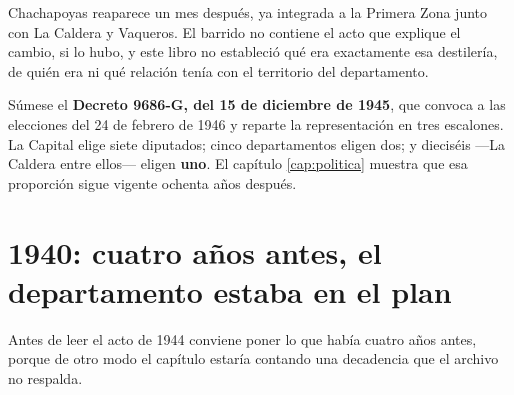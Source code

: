 \begin{cautela}
Chachapoyas reaparece un mes después, ya integrada a la Primera Zona junto con La Caldera y
Vaqueros. El barrido no contiene el acto que explique el cambio, si lo hubo, y este libro no
estableció qué era exactamente esa destilería, de quién era ni qué relación tenía con el
territorio del departamento. 
\end{cautela}

Súmese el \textbf{Decreto 9686-G, del 15 de diciembre de 1945}, que convoca a las elecciones
del 24 de febrero de 1946 y reparte la representación en tres escalones. La Capital elige siete
diputados; cinco departamentos eligen dos; y dieciséis ---La Caldera entre ellos--- eligen
\textbf{uno}. El capítulo \ref{cap:politica} muestra que esa proporción sigue vigente ochenta
años después.

\section{1940: cuatro años antes, el departamento estaba en el plan}

Antes de leer el acto de 1944 conviene poner lo que había cuatro años antes, porque de otro
modo el capítulo estaría contando una decadencia que el archivo no respalda.

